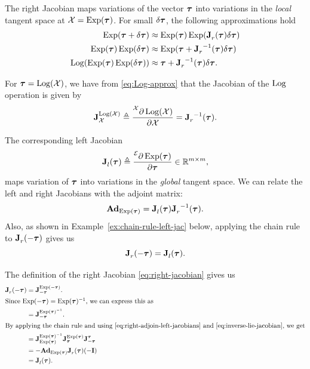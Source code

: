 The right Jacobian maps variations of the vector $\vectau$ into variations in the \emph{local} tangent space at $\cX = \Exp(\vectau)$.
For small $\delta \vectau$, the following approximations hold
\begin{align}
  \Exp(\vectau + \delta \vectau) &\approx \Exp(\vectau) \Exp(\jac{}{r}(\vectau) \delta \vectau)\\
  \Exp(\vectau) \Exp(\delta \vectau) &\approx \Exp(\vectau + \jac{}{r}^{-1}(\vectau) \delta \vectau)\\
  \Log(\Exp(\vectau) \Exp(\delta \vectau)) &\approx \vectau + \jac{}{r}^{-1}(\vectau)\delta\vectau. \label{eq:Log-approx}
\end{align}

For $\vectau = \Log(\cX)$, we have from \eqref{eq:Log-approx} that the Jacobian of the $\Log$ operation is given by
\begin{equation}
  \jac{\Log(\cX)}{\cX} \triangleq \frac{\prescript{\cX}{}{\partial \Log(\cX)}}{\partial \cX} = \jac{}{r}^{-1}(\vectau).
\end{equation}

The corresponding left Jacobian
\begin{equation}
  \jac{}{l}(\vectau) \triangleq \frac{\prescript{\cE}{}{\partial}\Exp(\vectau)}{\partial \vectau} \in \bbR^{m \times m},
\end{equation}
maps variation of $\vectau$ into variations in the \emph{global} tangent space.
We can relate the left and right Jacobians with the adjoint matrix:
\begin{equation} \label{eq:right-adjoin-left-jacobians}
  \mAd_{\Exp(\vectau)} = \jac{}{l}(\vectau) \jac{}{r}^{-1}(\vectau).
\end{equation}
Also, as shown in Example~\ref{ex:chain-rule-left-jac} below, applying the chain rule to $\jac{}{r}(-\vectau)$ gives us
\begin{equation} \label{eq:lie-right-jac-from-left}
  \jac{}{r}(-\vectau) = \jac{}{l}(\vectau).
\end{equation}

\begin{example}[frametitle=Applying the chain rule to $\jac{}{r}(-\vectau)$] \label{ex:chain-rule-left-jac}
The definition of the right Jacobian \eqref{eq:right-jacobian} gives us
\begin{subequations}
\begin{align}
  \jac{}{r}(-\vectau) &= \jac{\Exp(-\vectau)}{-\vectau}.\\ 
  \intertext{Since $\Exp(-\vectau) = \Exp(\vectau)^{-1}$, we can express this as}
  &= \jac{\Exp(\vectau)^{-1}}{-\vectau}.\\
  \intertext{By applying the chain rule and using \eqref{eq:right-adjoin-left-jacobians} and \eqref{eq:inverse-lie-jacobian}, we get}
  &= \jac{\Exp(\vectau)^{-1}}{\Exp(\vectau)} \jac{\Exp(\vectau)}{\vectau} \jac{\vectau}{-\vectau}\\
  &= -\mAd_{\Exp(\vectau)} \jac{}{r}(\vectau) (-\matI)\\
  &= \jac{}{l}(\vectau).
\end{align}
\end{subequations}
\end{example}

